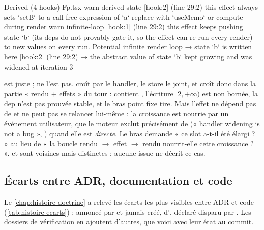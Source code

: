 \begin{sortie}
  Derived  (4 hooks)  Fp.tsx
    warn   derived-state  [hook:2]  (line 29:2)  this effect always sets `setB` to a call-free expression of `a` replace with `useMemo` or compute during render
    warn   infinite-loop  [hook:1]  (line 29:2)  this effect keeps pushing state `b` (its deps do not provably gate it, so the effect can re-run every render) to new values on every run. Potential infinite render loop
       → state `b` is written here [hook:2] (line 29:2)
       → the abstract value of state `b` kept growing and was widened at iteration 3
\end{sortie}

 est juste ;  ne l'est pas.  croît par le handler, le store le joint, et  croît donc dans la partie « rendu + effets » du tour :  contient , l'écriture $[2,+\infty)$ est non bornée, la dep  n'est pas prouvée stable, et le bras point fixe tire. Mais l'effet ne dépend pas de  et ne peut pas se relancer lui-même : la croissance est nourrie par un événement utilisateur, que le moteur exclut précisément de  (« handler widening is not a bug », ) quand elle est \emph{directe}. Le bras demande « ce slot a-t-il été élargi ? » au lieu de « la boucle rendu $\to$ effet $\to$ rendu nourrit-elle cette croissance ? ».  et  sont voisines mais distinctes ; aucune issue ne décrit ce cas.

\subsection{Écarts entre ADR, documentation et code}
\label{sec:limites-perspectives-ecarts}

Le \cref{chap:histoire-doctrine} a relevé les écarts les plus visibles entre ADR et code (\cref{tab:histoire-ecarts}) :  annoncé par  et jamais créé,  d',  déclaré disparu par . Les dossiers de vérification en ajoutent d'autres, que voici avec leur état au commit.

